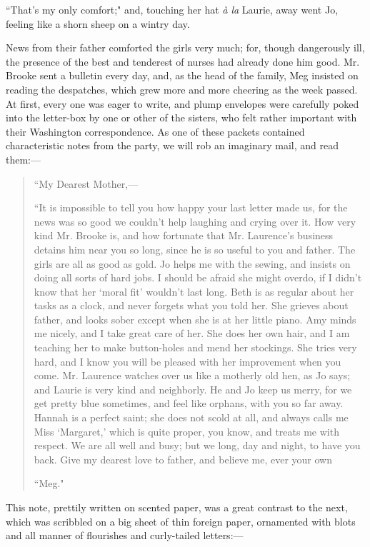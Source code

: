 ``That's my only comfort;" and, touching her hat \emph{à
la} Laurie, away went Jo, feeling like a shorn sheep on a wintry day.

News from their father comforted the girls very much; for, though
dangerously ill, the presence of the best and tenderest of nurses had
already done him good. Mr. Brooke sent a bulletin every day, and, as the
head of the family, Meg insisted on reading the despatches, which grew
more and more cheering as the week passed. At first, every one was eager
to write, and plump envelopes were carefully poked into the letter-box
by one or other of the sisters, who felt rather important with their
Washington correspondence. As one of these packets contained
characteristic notes from the party, we will rob an imaginary mail, and
read them:---

\begin{quote}
``My Dearest Mother,---

``It is impossible to tell you how happy your last letter made us, for
the news was so good we couldn't help laughing and
crying over it. How very kind Mr. Brooke is, and how fortunate that Mr.
Laurence's business detains him near you so long, since
he is so useful to you and father. The girls are all as good as gold. Jo
helps me with the sewing, and insists on doing all sorts of hard jobs. I
should be afraid she might overdo, if I didn't know that
her `moral fit'
wouldn't last long. Beth is as regular about her tasks
as a clock, and never forgets what you told her. She grieves about
father, and looks sober except when she is at her little piano. Amy
minds me nicely, and I take great care of her. She does her own hair,
and I am teaching her to make button-holes and mend her stockings. She
tries very hard, and I know you will be pleased with her improvement
when you come. Mr. Laurence watches over us like a motherly old hen, as
Jo says; and Laurie is very kind and neighborly. He and Jo keep us
merry, for we get pretty blue sometimes, and feel like orphans, with you
so far away. Hannah is a perfect saint; she does not scold at all, and
always calls me Miss `Margaret,' which
is quite proper, you know, and treats me with respect. We are all well
and busy; but we long, day and night, to have you back. Give my dearest
love to father, and believe me, ever your own

``Meg."
\end{quote}

This note, prettily written on scented paper, was a great contrast to
the next, which was scribbled on a big sheet of thin foreign paper,
ornamented with blots and all manner of flourishes and curly-tailed
letters:---

